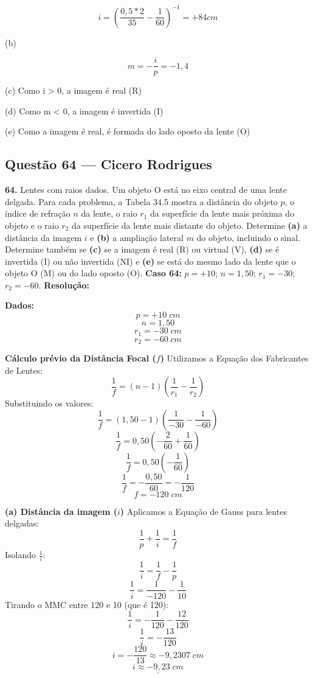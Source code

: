 \documentclass[12pt,a4paper]{article}
\begin{document}
\[
i = (\frac{0,5*2}{35} - \frac{1}{60})^{-1} = +84cm
\]

(b)

\[
m = -\frac{i}{p} = - 1,4 
\]

(c) Como i > 0, a imagem é real (R)

(d) Como m < 0, a imagem é invertida (I)

(e) Como a imagem é real, é formada do lado oposto da lente (O)

\subsection{Questão 64 — Cicero Rodrigues}

\textbf{64. }\normalfont Lentes com raios dados. Um objeto O está no eixo central de uma lente delgada. Para cada problema, a Tabela 34.5 mostra a distância do objeto $p$, o índice de refração $n$ da lente, o raio $r_1$ da superfície da lente mais próxima do objeto e o raio $r_2$ da superfície da lente mais distante do objeto. Determine \textbf{(a)} a distância da imagem $i$ e \textbf{(b)} a ampliação lateral $m$ do objeto, incluindo o sinal. Determine também se \textbf{(c)} se a imagem é real (R) ou virtual (V), \textbf{(d)} se é invertida (I) ou não invertida (NI) e \textbf{(e)} se está do mesmo lado da lente que o objeto O (M) ou do lado oposto (O). \textbf{Caso 64:} $p = +10$; $n = 1,50$; $r_1 = -30$; $r_2 = -60$.
\textbf{Resolução:}
\vspace{0.3cm}

\textbf{Dados:}
\[p = +10\;cm\]
\[n = 1,50\]
\[r_1 = -30\;cm\]
\[r_2 = -60\;cm\]

\vspace{0.2cm}
\textbf{Cálculo prévio da Distância Focal (\(f\))}
Utilizamos a Equação dos Fabricantes de Lentes:
\[\frac{1}{f} = (n - 1) \left( \frac{1}{r_1} - \frac{1}{r_2} \right)\]
Substituindo os valores:
\[\frac{1}{f} = (1,50 - 1) \left( \frac{1}{-30} - \frac{1}{-60} \right)\]
\[\frac{1}{f} = 0,50 \left( -\frac{2}{60} + \frac{1}{60} \right)\]
\[\frac{1}{f} = 0,50 \left( -\frac{1}{60} \right)\]
\[\frac{1}{f} = -\frac{0,50}{60} = -\frac{1}{120}\]
\[f = -120\;cm\]

\vspace{0.2cm}
\textbf{(a) Distância da imagem (\(i\))}
Aplicamos a Equação de Gauss para lentes delgadas:
\[\frac{1}{p} + \frac{1}{i} = \frac{1}{f}\]
Isolando \(\frac{1}{i}\):
\[\frac{1}{i} = \frac{1}{f} - \frac{1}{p}\]
\[\frac{1}{i} = \frac{1}{-120} - \frac{1}{10}\]
Tirando o MMC entre 120 e 10 (que é 120):
\[\frac{1}{i} = -\frac{1}{120} - \frac{12}{120}\]
\[\frac{1}{i} = -\frac{13}{120}\]
\[i = -\frac{120}{13} \approx -9,2307\;cm\]
\[\underline{i \approx -9,23\;cm}\]
\end{document}
